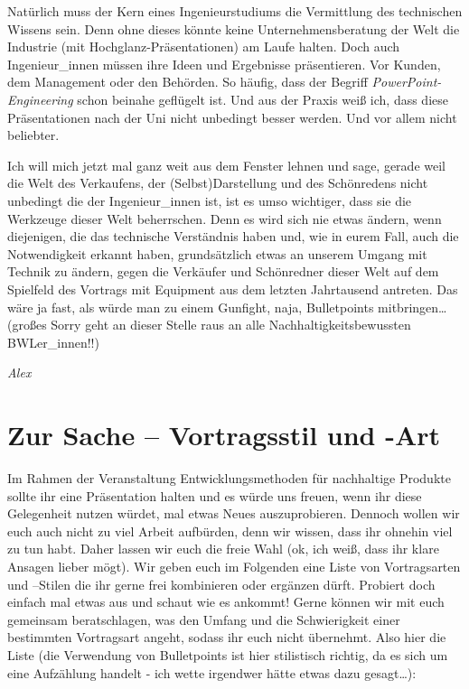 \documentclass[DIV=15,headinclude=true]{scrartcl}
\begin{document}
Natürlich muss der Kern eines Ingenieurstudiums die Vermittlung des
technischen Wissens sein. Denn ohne dieses könnte keine
Unternehmensberatung der Welt die Industrie (mit
Hochglanz-Präsentationen) am Laufe halten. Doch auch Ingenieur\_innen
müssen ihre Ideen und Ergebnisse präsentieren. Vor Kunden, dem
Management oder den Behörden. So häufig, dass der Begriff
\emph{PowerPoint-Engineering} schon beinahe geflügelt ist. Und aus der
Praxis weiß ich, dass diese Präsentationen nach der Uni nicht unbedingt
besser werden. Und vor allem nicht beliebter.

Ich will mich jetzt mal ganz weit aus dem Fenster lehnen und sage,
gerade weil die Welt des Verkaufens, der (Selbst)Darstellung und des
Schönredens nicht unbedingt die der Ingenieur\_innen ist, ist es umso
wichtiger, dass sie die Werkzeuge dieser Welt beherrschen. Denn es wird
sich nie etwas ändern, wenn diejenigen, die das technische Verständnis
haben und, wie in eurem Fall, auch die Notwendigkeit erkannt haben,
grundsätzlich etwas an unserem Umgang mit Technik zu ändern, gegen die
Verkäufer und Schönredner dieser Welt auf dem Spielfeld des Vortrags mit
Equipment aus dem letzten Jahrtausend antreten. Das wäre ja fast, als
würde man zu einem Gunfight, naja, Bulletpoints mitbringen\ldots{}
(großes Sorry geht an dieser Stelle raus an alle
Nachhaltigkeitsbewussten BWLer\_innen!!)

\emph{Alex}

\section{Zur Sache -- Vortragsstil und
  -Art}

Im Rahmen der Veranstaltung Entwicklungsmethoden für nachhaltige
Produkte sollte ihr eine Präsentation halten und es würde uns freuen,
wenn ihr diese Gelegenheit nutzen würdet, mal etwas Neues
auszuprobieren. Dennoch wollen wir euch auch nicht zu viel Arbeit
aufbürden, denn wir wissen, dass ihr ohnehin viel zu tun habt. Daher
lassen wir euch die freie Wahl (ok, ich weiß, dass ihr klare Ansagen
lieber mögt). Wir geben euch im Folgenden eine Liste von Vortragsarten
und --Stilen die ihr gerne frei kombinieren oder ergänzen dürft.
Probiert doch einfach mal etwas aus und schaut wie es ankommt! Gerne
können wir mit euch gemeinsam beratschlagen, was den Umfang und die
Schwierigkeit einer bestimmten Vortragsart angeht, sodass ihr euch nicht
übernehmt. Also hier die Liste (die Verwendung von Bulletpoints ist hier
stilistisch richtig, da es sich um eine Aufzählung handelt - ich wette
irgendwer hätte etwas dazu gesagt\ldots):
\end{document}
